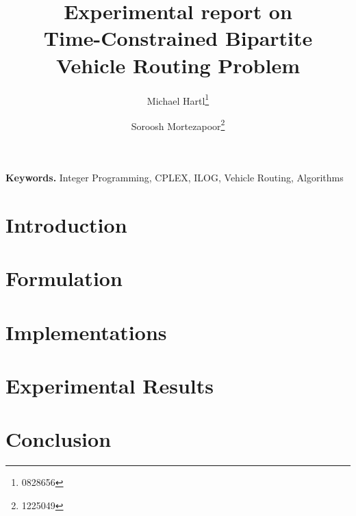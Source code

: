 \documentclass[fancy]{article}
\title{\vspace{-15mm}Experimental report on \vspace{5mm} \\
\fontsize{24pt}{10pt}\selectfont\textbf{Time-Constrained Bipartite Vehicle Routing Problem}}
\author[1]{Michael Hartl\thanks{0828656}}
\author[1]{Soroosh Mortezapoor\thanks{1225049}}
\affil[1]{Vienna University of Technology}
\date{}
\begin{document}
\maketitle %
\begin{abstract}

\end{abstract}


\thispagestyle{fancy} %








\smallskip
\noindent \textbf{Keywords.} Integer Programming, CPLEX, ILOG, Vehicle Routing,
Algorithms




\section{Introduction}


\section{Formulation}


\section{Implementations}


\section{Experimental Results}


\section{Conclusion}




 



\end{document}
